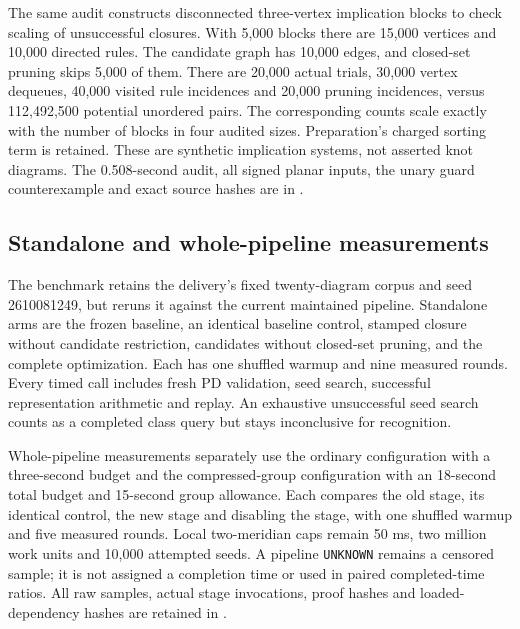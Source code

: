 The same audit constructs disconnected three-vertex implication blocks to
check scaling of unsuccessful closures. With 5,000 blocks there are 15,000
vertices and 10,000 directed rules. The candidate graph has 10,000 edges,
and closed-set pruning skips 5,000 of them. There are 20,000 actual trials,
30,000 vertex dequeues, 40,000 visited rule incidences and 20,000 pruning
incidences, versus 112,492,500 potential unordered pairs. The corresponding
counts scale exactly with the number of blocks in four audited sizes.
Preparation's charged sorting term is retained. These are synthetic
implication systems, not asserted knot diagrams. The 0.508-second audit,
all signed planar inputs, the unary guard counterexample and exact source
hashes are in .

\subsection{Standalone and whole-pipeline measurements}

The benchmark retains the delivery's fixed twenty-diagram corpus and seed
2610081249, but reruns it against the current maintained pipeline. Standalone
arms are the frozen baseline, an identical baseline control, stamped closure
without candidate restriction, candidates without closed-set pruning, and
the complete optimization. Each has one shuffled warmup and nine measured
rounds. Every timed call includes fresh PD validation, seed search, successful
representation arithmetic and replay. An exhaustive unsuccessful seed search
counts as a completed class query but stays inconclusive for recognition.



Whole-pipeline measurements separately use the ordinary configuration with
a three-second budget and the compressed-group configuration with an
18-second total budget and 15-second group allowance. Each compares the
old stage, its identical control, the new stage and disabling the stage,
with one shuffled warmup and five measured rounds. Local two-meridian caps
remain 50 ms, two million work units and 10,000 attempted seeds. A pipeline
\texttt{UNKNOWN} remains a censored sample; it is not assigned a completion
time or used in paired completed-time ratios. All raw samples, actual stage
invocations, proof hashes and loaded-dependency hashes are retained in
.



